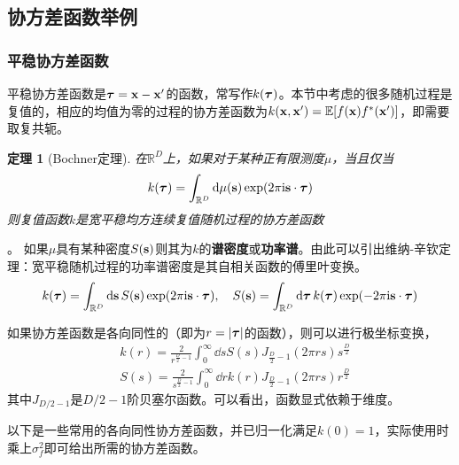 \documentclass[12pt,UTF8]{article}
\newtheorem{theorem}{定理}[section]
\begin{document}
        \subsection{协方差函数举例}
            \subsubsection{平稳协方差函数}
                平稳协方差函数是$\vb*{\tau}=\vb{x}-\vb{x}'$的函数，常写作$k(\vb*{\tau})$。本节中考虑的很多随机过程是复值的，相应的均值为零的过程的协方差函数为$k(\vb{x},\vb{x}')=\mathbb{E}[f(\vb{x})f^*(\vb{x}')]$，即需要取复共轭。\par
                \begin{theorem}[Bochner定理]
                    在$\mathbb{R}^D$上，如果对于某种正有限测度$\mu$，当且仅当
                    \begin{equation}
                        k(\vb*{\tau})=\int_{\mathbb{R}^D}{\dd{\mu(\vb{s})}\exp(2\pi\mathrm{i}\vb{s}\cdot\vb*{\tau})}
                    \end{equation}
                    则复值函数$k$是宽平稳均方连续复值随机过程的协方差函数
                \end{theorem}。
                如果$\mu$具有某种密度$S(\vb{s})$则其为$k$的\textbf{谱密度}或\textbf{功率谱}。由此可以引出维纳-辛钦定理：宽平稳随机过程的功率谱密度是其自相关函数的傅里叶变换。
                \begin{equation}
                    k(\vb*{\tau})=\int_{\mathbb{R}^D}{\dd{\vb{s}}S(\vb{s})\exp(2\pi\mathrm{i}\vb{s}\cdot\vb*{\tau})}\qc S(\vb{s})=\int_{\mathbb{R}^D}{\dd{\vb*{\tau}}k(\vb*{\tau})\exp(-2\pi\mathrm{i}\vb{s}\cdot\vb*{\tau})}
                \end{equation}\par
                如果协方差函数是各向同性的（即为$r=\abs{\vb*{\tau}}$的函数），则可以进行极坐标变换，
                \begin{align}
                    &k(r)=\frac{2}{r^{\frac{D}{2}-1}}\int_0^{\infty}{\dd{s}S(s)J_{\frac{D}{2}-1}(2\pi rs)s^{\frac{D}{2}}} \\
                    &S(s)=\frac{2}{s^{\frac{D}{2}-1}}\int_0^{\infty}{\dd{r}k(r)J_{\frac{D}{2}-1}(2\pi rs)r^{\frac{D}{2}}}
                \end{align}
                其中$J_{D/2-1}$是$D/2-1$阶贝塞尔函数。可以看出，函数显式依赖于维度。\par
                以下是一些常用的各向同性协方差函数，并已归一化满足$k(0)=1$，实际使用时乘上$\sigma_f^2$即可给出所需的协方差函数。\par
\end{document}
